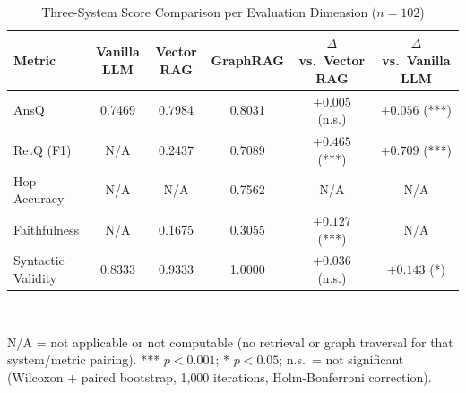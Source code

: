 \begin{table}[t]
\caption{Three-System Score Comparison per Evaluation Dimension ($n=102$)}
\label{tbl:perbandingan}
\centering
\begin{tabular}{|l|c|c|c|c|c|}
\hline
\textbf{Metric} & \textbf{Vanilla LLM} & \textbf{Vector RAG} & \textbf{GraphRAG} & \textbf{$\Delta$ vs.\ Vector RAG} & \textbf{$\Delta$ vs.\ Vanilla LLM} \\
\hline
AnsQ & 0.7469 & 0.7984 & 0.8031 & $+0.005$ (n.s.) & $+0.056$ (***) \\
\hline
RetQ (F1) & N/A & 0.2437 & 0.7089 & $+0.465$ (***) & $+0.709$ (***) \\
\hline
Hop Accuracy & N/A & N/A & 0.7562 & N/A & N/A \\
\hline
Faithfulness & N/A & 0.1675 & 0.3055 & $+0.127$ (***) & N/A \\
\hline
Syntactic Validity & 0.8333 & 0.9333 & 1.0000 & $+0.036$ (n.s.) & $+0.143$ (*) \\
\hline
\end{tabular}
\\[4pt]
{\footnotesize \raggedright N/A = not applicable or not computable (no retrieval or graph traversal for that system/metric pairing). *** $p<0.001$; * $p<0.05$; n.s.\ = not significant (Wilcoxon + paired bootstrap, 1{,}000 iterations, Holm-Bonferroni correction).\par}
\end{table}
